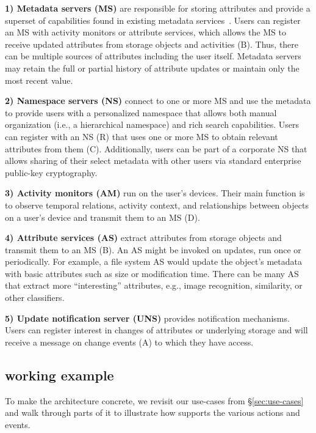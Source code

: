 \noindent\textbf{1) Metadata servers (MS)}
are responsible for storing attributes and provide a superset of capabilities found in existing metadata services~\cite{federatedMetaData,smartstore}. Users can register an MS with activity monitors or attribute services, which allows the MS to receive updated attributes from storage objects and activities (B). Thus, there can be multiple sources of attributes including the user itself. Metadata servers may retain the full or partial history of attribute updates or maintain only the most recent value. 

\noindent\textbf{2) Namespace servers (NS)}
connect to one or more MS and use the metadata to provide users with a personalized namespace that allows both manual organization (i.e., a hierarchical namespace) and rich search capabilities. 
Users can register with an NS (R) that uses one or more MS to obtain relevant attributes from them (C). Additionally, users can be part of a corporate NS that allows sharing of their select metadata with other users via standard enterprise public-key cryptography.

\noindent\textbf{3) Activity monitors (AM)}
run on the user's devices. Their main function is to observe temporal relations, activity context, and relationships between objects on a user's device and transmit them to an MS (D).

\noindent\textbf{4) Attribute services (AS)}
extract attributes from storage objects and transmit them to an MS (B). An AS might be invoked on updates, run once or periodically. For example, a file system AS would update the object's metadata with basic attributes such as size or modification time. There can be many AS that extract more ``interesting'' attributes, e.g., image recognition, similarity, or other classifiers. 

\noindent\textbf{5) Update notification server (UNS)}
provides notification mechanisms. Users can register interest in changes of attributes or underlying storage and will receive a message on change events (A) to which they have access.

\subsection{\system working example}

To make the \system architecture concrete, we revisit our use-cases from \S\ref{sec:use-cases} and walk through parts of it to illustrate how \system supports the various actions and events. 

